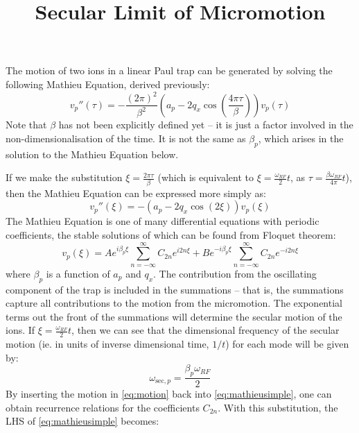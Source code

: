 \documentclass{article}
\title{Secular Limit of Micromotion}
\begin{document}
\maketitle
\noindent The motion of two ions in a linear Paul trap can be generated by solving the following Mathieu Equation, derived previously:
\begin{equation}
v_p''(\tau) = - \frac{(2 \pi)^2}{\beta^2} \left( a_p - 2 q_x \cos \left( \frac{4 \pi \tau}{\beta} \right) \right) v_p (\tau)	
\label{eq:mathieu}
\end{equation}
Note that $\beta$ has not been explicitly defined yet -- it is just a factor involved in the non-dimensionalisation of the time. It is not the same as $\beta_p$, which arises in the solution to the Mathieu Equation below. \par
\medskip
\noindent If we make the substitution $\xi = \frac{2 \pi \tau}{\beta}$ (which is equivalent to $\xi = \frac{\omega_{RF}}{2} t$, as $\tau = \frac{\beta \omega_{RF}}{4 \pi} t$), then the Mathieu Equation can be expressed more simply as:
\begin{equation}
v_p''(\xi)	= - \left( a_p - 2 q_x \cos \left( 2 \xi \right) \right) v_p (\xi)
\label{eq:mathieusimple}
\end{equation}
The Mathieu Equation is one of many differential equations with periodic coefficients, the stable solutions of which can be found from Floquet theorem:
\begin{equation}
	v_p (\xi) = A e^{i \beta_p \xi} \sum_{n = - \infty}^{\infty} C_{2n} e^{i 2 n \xi} + B e^{- i \beta_p \xi} \sum_{n = - \infty}^{\infty} C_{2n} e^{- i 2 n \xi}
	\label{eq:motion}
\end{equation}
where $\beta_p$ is a function of $a_p$ and $q_x$. The contribution from the oscillating component of the trap is included in the summations -- that is, the summations capture all contributions to the motion from the micromotion. The exponential terms out the front of the summations will determine the secular motion of the ions. 
If $\xi = \frac{\omega_{RF}}{2} t$, then we can see that the dimensional frequency of the secular motion (ie. in units of inverse dimensional time, $1/t$) for each mode will be given by:
\begin{equation}
\omega_{\text{sec}, p} = \frac{\beta_p \omega_{RF}}{2} \label{eq:sec}
\end{equation}
By inserting the motion in \eqref{eq:motion} back into \eqref{eq:mathieusimple}, one can obtain recurrence relations for the coefficients $C_{2n}$. With this substitution, the LHS of \eqref{eq:mathieusimple} becomes:
\end{document}
